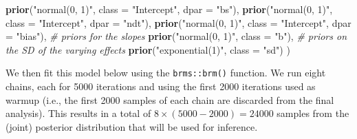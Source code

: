 \documentclass[
  11pt,
  english,
  ,doc,floatsintext]{apa6}
\newenvironment{Shaded}{}{}
\newcommand{\CommentTok}[1]{\textcolor[rgb]{0.38,0.63,0.69}{\textit{#1}}}
\newcommand{\DataTypeTok}[1]{\textcolor[rgb]{0.56,0.13,0.00}{#1}}
\newcommand{\KeywordTok}[1]{\textcolor[rgb]{0.00,0.44,0.13}{\textbf{#1}}}
\newcommand{\NormalTok}[1]{#1}
\newcommand{\StringTok}[1]{\textcolor[rgb]{0.25,0.44,0.63}{#1}}
\begin{document}
\begin{Shaded}
\begin{Highlighting}[]
  \KeywordTok{prior}\NormalTok{(}\StringTok{"normal(0, 1)"}\NormalTok{, }\DataTypeTok{class =} \StringTok{"Intercept"}\NormalTok{, }\DataTypeTok{dpar =} \StringTok{"bs"}\NormalTok{),}
  \KeywordTok{prior}\NormalTok{(}\StringTok{"normal(0, 1)"}\NormalTok{, }\DataTypeTok{class =} \StringTok{"Intercept"}\NormalTok{, }\DataTypeTok{dpar =} \StringTok{"ndt"}\NormalTok{),}
  \KeywordTok{prior}\NormalTok{(}\StringTok{"normal(0, 1)"}\NormalTok{, }\DataTypeTok{class =} \StringTok{"Intercept"}\NormalTok{, }\DataTypeTok{dpar =} \StringTok{"bias"}\NormalTok{),}
  \CommentTok{# priors for the slopes}
  \KeywordTok{prior}\NormalTok{(}\StringTok{"normal(0, 1)"}\NormalTok{, }\DataTypeTok{class =} \StringTok{"b"}\NormalTok{),}
  \CommentTok{# priors on the SD of the varying effects}
  \KeywordTok{prior}\NormalTok{(}\StringTok{"exponential(1)"}\NormalTok{, }\DataTypeTok{class =} \StringTok{"sd"}\NormalTok{)}
\NormalTok{  )}
\end{Highlighting}
\end{Shaded}

We then fit this model below using the \texttt{brms::brm()} function. We run eight chains, each for 5000 iterations and using the first 2000 iterations used as warmup (i.e., the first 2000 samples of each chain are discarded from the final analysis). This results in a total of \(8 \times (5000 - 2000) = 24000\) samples from the (joint) posterior distribution that will be used for inference.
\end{document}

